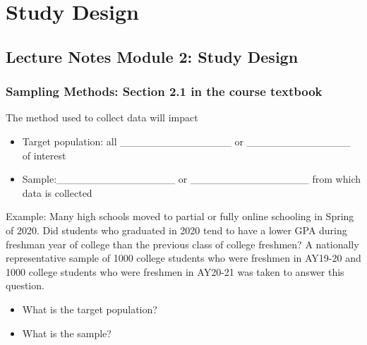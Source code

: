\documentclass[
]{report}
\providecommand{\tightlist}{%
  \setlength{\itemsep}{0pt}\setlength{\parskip}{0pt}}
\begin{document}
\hypertarget{study-design}{%
\chapter{Study Design}\label{study-design}}

\hypertarget{lecture-notes-module-2-study-design}{%
\section{Lecture Notes Module 2: Study Design}\label{lecture-notes-module-2-study-design}}


\hypertarget{sampling-methods-section-2.1-in-the-course-textbook}{%
\subsection*{Sampling Methods: Section 2.1 in the course textbook}\label{sampling-methods-section-2.1-in-the-course-textbook}}


The method used to collect data will impact

\begin{itemize}
\item
  Target population: all \_\_\_\_\_\_\_\_\_\_\_\_\_\_\_ or \_\_\_\_\_\_\_\_\_\_\_\_\_\_ of interest
\item
  Sample:\_\_\_\_\_\_\_\_\_\_\_\_\_\_\_\_ or \_\_\_\_\_\_\_\_\_\_\_\_\_\_\_\_ from which data is collected
\end{itemize}


Example: Many high schools moved to partial or fully online schooling in Spring of 2020. Did students who graduated in 2020 tend to have a lower GPA during freshman year of college than the previous class of college freshmen? A nationally representative sample of 1000 college students who were freshmen in AY19-20 and 1000 college students who were freshmen in AY20-21 was taken to answer this question.

\begin{itemize}
\tightlist
\item
  What is the target population?
\end{itemize}

\vspace{0.2in}

\begin{itemize}
\tightlist
\item
  What is the sample?
\end{itemize}
\end{document}

